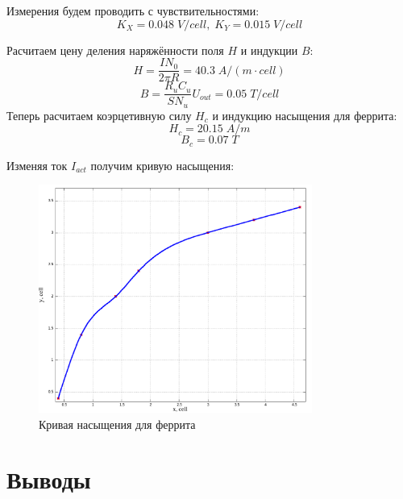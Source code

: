 \documentclass{article}
\begin{document}
Измерения будем проводить с чувствительностями:
\[ K_X = 0.048\; V/cell,\; K_Y = 0.015\; V/cell  \]

Расчитаем цену деления наряжённости поля $H$ и индукции $B$:
\[ H = \frac{IN_0}{2\pi R} = 40.3\; A/(m\cdot cell) \]
\[ B = \frac{R_uC_u}{SN_u}U_{out} = 0.05\; T/cell \]
Теперь расчитаем коэрцетивную силу $H_c$ и индукцию насыщения для феррита:
\[ H_c = 20.15\; A/m \]
\[ B_c = 0.07\; T \]

Изменяя ток $I_{act}$ получим кривую насыщения:
\begin{figure}[H]
    \centering
    \includegraphics[width = 0.8\textwidth]{3-d.png}
    \caption{Кривая насыщения для феррита}
\end{figure}

\section{Выводы}
\end{document}
